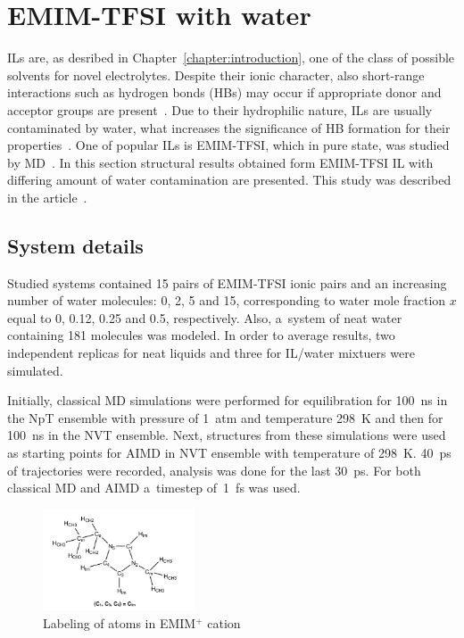 \section{EMIM-TFSI with water}
\label{section:il-h2o-structural}

ILs are, as desribed in Chapter~\ref{chapter:introduction}, one of the class of possible solvents for novel electrolytes. Despite their ionic character, also short-range interactions such as hydrogen bonds (HBs) may occur if appropriate donor and acceptor groups are present~\cite{ir-interactions-16,il-h2o-hb-il-1,il-h2o-hb-il-2,il-h2o-hb-il-3}. Due to their hydrophilic nature, ILs are usually contaminated by water, what increases the significance of HB formation for their properties~\cite{il-h2o-water-1,il-h2o-water-2,il-h2o-water-3,il-h2o-water-4,il-h2o-water-5}. One of popular ILs is EMIM-TFSI, which in pure state, was studied by MD~\cite{il-h2o-previous-work}. In this section structural results obtained form EMIM-TFSI IL with differing amount of water contamination are presented. This study was described in the article~\cite{il-h2o}.

\subsection{System details}

Studied systems contained 15 pairs of EMIM-TFSI ionic pairs and an increasing number of water molecules: 0, 2, 5 and 15, corresponding to water mole fraction $x$ equal to 0, 0.12, 0.25 and 0.5, respectively. Also, a~system of neat water containing 181 molecules was modeled. In order to average results, two independent replicas for neat liquids and three for IL/water mixtuers were simulated.

Initially, classical MD simulations were performed for equilibration for 100~ns in the NpT ensemble with pressure of 1~atm and temperature 298~K and then for 100~ns in the NVT ensemble. Next, structures from these simulations were used as starting points for AIMD in NVT ensemble with temperature of 298~K. 40~ps of trajectories were recorded, analysis was done for the last 30~ps. For both classical MD and AIMD a~timestep of~1~fs was used.

\begin{figure}[ht]
    \centering
    \includegraphics[width=0.4\textwidth]{img/3-structural-data-from-md-simulations/6-il-h2o/emim-labeling.png}
    \caption{Labeling of atoms in EMIM$^{+}$ cation}
    \label{fig:il-h2o-emim-labeling}
\end{figure}

